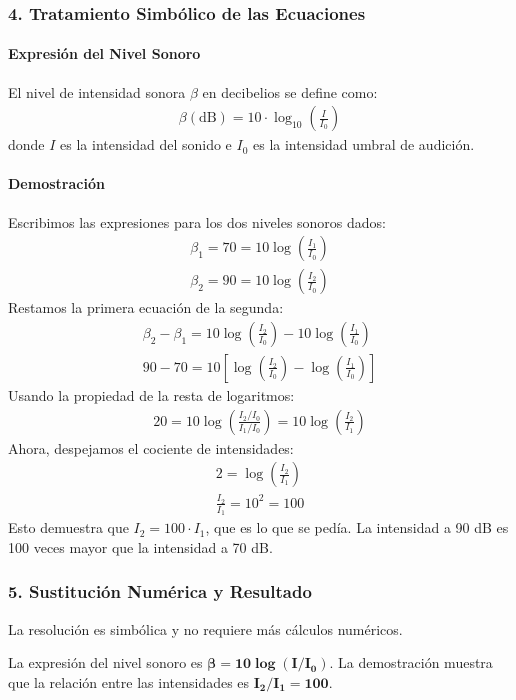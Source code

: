 \subsubsection*{4. Tratamiento Simbólico de las Ecuaciones}
\paragraph*{Expresión del Nivel Sonoro}
El nivel de intensidad sonora $\beta$ en decibelios se define como:
\begin{gather}
    \beta (\text{dB}) = 10 \cdot \log_{10}\left(\frac{I}{I_0}\right)
\end{gather}
donde $I$ es la intensidad del sonido e $I_0$ es la intensidad umbral de audición.

\paragraph*{Demostración}
Escribimos las expresiones para los dos niveles sonoros dados:
\begin{gather}
    \beta_1 = 70 = 10 \log\left(\frac{I_1}{I_0}\right) \\
    \beta_2 = 90 = 10 \log\left(\frac{I_2}{I_0}\right)
\end{gather}
Restamos la primera ecuación de la segunda:
\begin{gather}
    \beta_2 - \beta_1 = 10 \log\left(\frac{I_2}{I_0}\right) - 10 \log\left(\frac{I_1}{I_0}\right) \\
    90 - 70 = 10 \left[ \log\left(\frac{I_2}{I_0}\right) - \log\left(\frac{I_1}{I_0}\right) \right]
\end{gather}
Usando la propiedad de la resta de logaritmos:
\begin{gather}
    20 = 10 \log\left(\frac{I_2/I_0}{I_1/I_0}\right) = 10 \log\left(\frac{I_2}{I_1}\right)
\end{gather}
Ahora, despejamos el cociente de intensidades:
\begin{gather}
    2 = \log\left(\frac{I_2}{I_1}\right) \\
    \frac{I_2}{I_1} = 10^2 = 100
\end{gather}
Esto demuestra que $I_2 = 100 \cdot I_1$, que es lo que se pedía. La intensidad a 90 dB es 100 veces mayor que la intensidad a 70 dB.

\subsubsection*{5. Sustitución Numérica y Resultado}
La resolución es simbólica y no requiere más cálculos numéricos.
\begin{cajaresultado}
    La expresión del nivel sonoro es $\boldsymbol{\beta = 10 \log(I/I_0)}$. La demostración muestra que la relación entre las intensidades es $\boldsymbol{I_2/I_1 = 100}$.
\end{cajaresultado}

